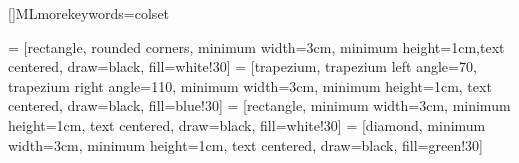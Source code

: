 \usepackage[labelfont=bf]{caption}  %
\captionsetup[table]{labelsep=space,justification=raggedright,singlelinecheck=off,skip=0pt} %
\captionsetup[figure]{labelsep=space}

\usepackage{framed}  %
\usepackage{xcolor}
\captionsetup[subfigure]{labelfont=rm}  %
\usepackage{rotating}%
\usepackage{listings}  %

\usepackage[toc,page,title, titletoc]{appendix}

[]{ML}{morekeywords={colset}}
\lstset{%
language=CPNML,
basicstyle=\footnotesize,
columns=flexible,
}



\usepackage{pgfplots}
\usetikzlibrary{spy,backgrounds}
\usepackage{pgfplotstable}

\usepackage{multirow}

\usepackage{textcomp}
\usepackage{float}
\usepackage{tikz}
\usetikzlibrary{shapes.geometric, arrows}
\usetikzlibrary{shapes.misc}
 = [rectangle, rounded corners, minimum width=3cm, minimum height=1cm,text centered, draw=black, fill=white!30]
 = [trapezium, trapezium left angle=70, trapezium right angle=110, minimum width=3cm, minimum height=1cm, text centered, draw=black, fill=blue!30]
 = [rectangle, minimum width=3cm, minimum height=1cm, text centered, draw=black, fill=white!30]
 = [diamond, minimum width=3cm, minimum height=1cm, text centered, draw=black, fill=green!30]

